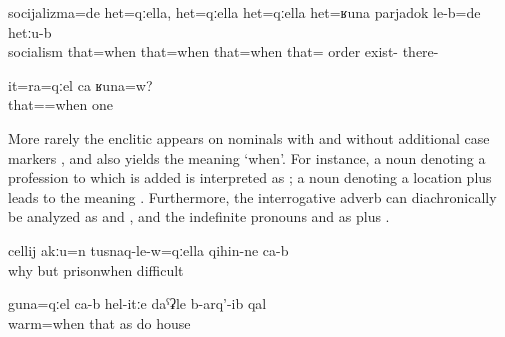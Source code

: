 \begin{exe}
	\ex	\label{ex:‎Socialism was at that time}
	\gll	socijalizma=de	het=qːella, het=qːella het=qːella het=ʁuna parjadok le-b=de hetːu-b\\
		socialism	that=when that=when that=when that= order exist- there-\\
	\glt	{}
		
	\ex	\label{ex:(Is this) that time also one and the same (shirt)?}
		\gll it=ra=qːel	ca	ʁuna=w?\\
			that==when	one	 \\
		\glt {}
\end{exe}

More rarely the enclitic appears on nominals with and without additional case markers , and also yields the meaning `when'. For instance, a noun denoting a profession to which  is added is interpreted as ; a noun denoting a location plus  leads to the meaning  . Furthermore, the interrogative adverb   can diachronically be analyzed as   and , and the indefinite pronouns  and   as   plus . 
%

\begin{exe}

	\ex	\label{ex:‎Because when (you are) in prison it is difficult}
	\gll	cellij	akːu=n	tusnaq-le-w=qːella	qihin-ne	ca-b\\
		why	but	prisonwhen	difficult	\\
	\glt	{}

	\ex	\label{ex:‎When it is warm (i.e. in warm places) the houses are built like thisMorph}
	\gll	guna=qːel	ca-b	hel-itːe	daˁʡle	b-arq'-ib	qal\\
		warm=when		that	as	do	house	\\
	\glt	{}
\end{exe} 


